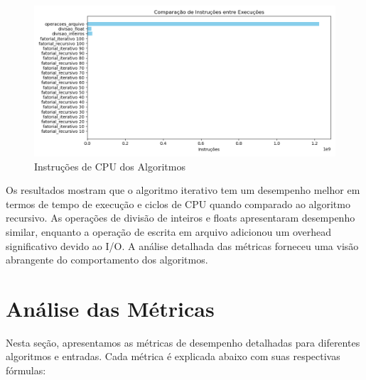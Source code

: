 \documentclass[12pt]{article}
\begin{document}
\begin{figure}[H]
    \centering
    \includegraphics[width=\linewidth]{resultados/instructions.png}
    \caption{Instruções de CPU dos Algoritmos}
    \label{fig:instrucoes_cpu}
\end{figure}

Os resultados mostram que o algoritmo iterativo tem um desempenho melhor em termos de tempo de execução e ciclos de CPU quando comparado ao algoritmo recursivo. As operações de divisão de inteiros e floats apresentaram desempenho similar, enquanto a operação de escrita em arquivo adicionou um overhead significativo devido ao I/O. A análise detalhada das métricas forneceu uma visão abrangente do comportamento dos algoritmos.

\section{Análise das Métricas}

Nesta seção, apresentamos as métricas de desempenho detalhadas para diferentes algoritmos e entradas. Cada métrica é explicada abaixo com suas respectivas fórmulas:
\end{document}
